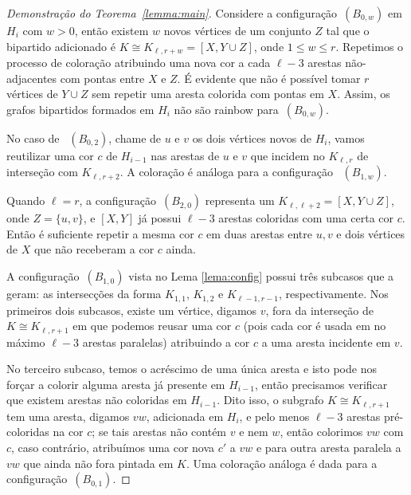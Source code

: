 \documentclass[12pt,a4paper]{book}
\newcommand{\K}{K_{\ell,r}} %
\begin{document}
\begin{proof}[Demonstração do Teorema~\ref{lemma:main}]
      Considere a configuração~\hyperref[configB]{$(B_{0,w})$} em
      $H_i$ com $w > 0$, então existem $w$ novos vértices de um conjunto $Z$ tal que o bipartido adicionado é $K \cong K_{\ell,r+w} =[X, Y \cup Z]$, 
      onde $1 \leq w \leq r$.  
      Repetimos o processo de coloração atribuindo uma nova cor a cada $\ell-3$ arestas 
      não-adjacentes com pontas entre $X$ e $Z$. 
      É evidente que não é possível tomar $r$ vértices de $Y \cup Z$ sem repetir uma aresta colorida com pontas em $X$.
      Assim, os grafos bipartidos formados em $H_i$ não são rainbow para~\hyperref[configB]{$(B_{0,w})$}.  
      
	  No caso de ~\hyperref[configB]{$(B_{0,2})$}, chame de $u$ e $v$ os dois vértices novos de $H_i$, vamos reutilizar uma cor $c$ de $H_{i-1}$ nas arestas de $u$ e $v$ que incidem no $\K$ de interseção com $K_{\ell,r+2}$.  
        A coloração é análoga para a configuração ~\hyperref[configB]{$(B_{1,w})$}.

        Quando $\ell = r$, a configuração~\hyperref[configB]{$(B_{2,0})$} representa um 
        $K_{\ell, \ell+2} = [X, Y \cup Z]$, onde $Z = \{u,v\}$, e $[X,Y]$ já possui $\ell-3$ arestas coloridas com uma certa cor $c$. 
        Então é suficiente repetir a mesma cor $c$ em duas arestas entre $u,v$ e dois vértices de $X$ que não receberam a cor $c$ ainda.
        
       A configuração~\hyperref[configB]{$(B_{1,0})$} vista no Lema \ref{lema:config} possui três subcasos que a geram: 
       as intersecções da forma $K_{1,1}$, $K_{1,2}$ e $K_{\ell-1,r-1}$, respectivamente. 
       Nos primeiros dois subcasos, existe um vértice, digamos $v$,
        fora da interseção de $K \cong K_{\ell,r+1}$ em que podemos reusar uma
        cor $c$ (pois cada cor é usada em no máximo $\ell-3$ arestas paralelas) atribuindo a cor $c$ a uma aresta incidente em $v$.
                
        No terceiro subcaso, temos o acréscimo de uma única aresta e isto pode nos forçar a colorir alguma aresta já presente em $H_{i-1}$, então precisamos verificar que existem arestas não coloridas em $H_{i-1}$. 
        Dito isso, o subgrafo $K \cong K_{\ell,r+1}$ tem uma aresta, digamos $vw$, adicionada em $H_i$, e pelo menos $\ell-3$ arestas pré-coloridas na cor $c$;
        se tais arestas não contém $v$ e nem $w$, então colorimos $vw$ com $c$, caso contrário, atribuímos uma cor nova $c'$ a $vw$ e para outra aresta paralela a $vw$ que ainda não fora pintada em $K$.  
        Uma coloração análoga é dada para a configuração~\hyperref[configB]{$(B_{0,1})$}.
        

\end{proof}
\end{document}
